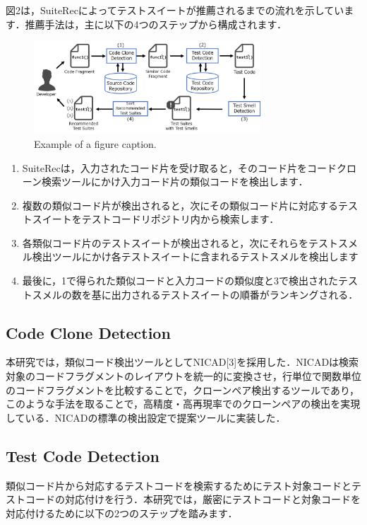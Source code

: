 \documentclass[conference]{IEEEtran}
\begin{document}
図2は，SuiteRecによってテストスイートが推薦されるまでの流れを示しています．推薦手法は，主に以下の4つのステップから構成されます．

\begin{figure}[htbp]
\centerline{\includegraphics[width=8.5cm]{SuiteRec-outline.pdf}}
\caption{Example of a figure caption.}
\label{fig}
\end{figure}

\begin{enumerate}
\renewcommand{\labelenumi}{(\arabic{enumi})}
\item SuiteRecは，入力されたコード片を受け取ると，そのコード片をコードクローン検索ツールにかけ入力コード片の類似コードを検出します．
\item 複数の類似コード片が検出されると，次にその類似コード片に対応するテストスイートをテストコードリポジトリ内から検索します．
\item 各類似コード片のテストスイートが検出されると，次にそれらをテストスメル検出ツールにかけ各テストスイートに含まれるテストスメルを検出します
\item 最後に，1で得られた類似コードと入力コードの類似度と3で検出されたテストスメルの数を基に出力されるテストスイートの順番がランキングされる．
\end{enumerate}


\subsection{Code Clone Detection}
本研究では，類似コード検出ツールとしてNICAD[3]を採用した．NICADは検索対象のコードフラグメントのレイアウトを統一的に変換させ，行単位で関数単位のコードフラグメントを比較することで，クローンペア検出するツールであり，このような手法を取ることで，高精度・高再現率でのクローンペアの検出を実現している．NICADの標準の検出設定で提案ツールに実装した．

\subsection{Test Code Detection}
類似コード片から対応するテストコードを検索するためにテスト対象コードとテストコードの対応付けを行う．本研究では，厳密にテストコードと対象コードを対応付けるために以下の2つのステップを踏みます．
\end{document}
